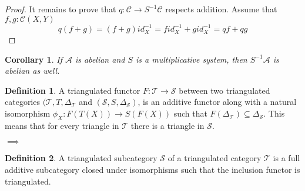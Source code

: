 \documentclass[11pt]{article}
\newtheorem{corollary}{Corollary}[theorem]
\theoremstyle{definition}
\newtheorem{definition}{Definition}[section]
\theoremstyle{remark}
\begin{document}
\begin{proof}
                It remains to prove that $q:\mathcal{C}\rightarrow S^{-1}\mathcal{C}$ respects addition. Assume that $f,g:\mathcal{C}(X,Y)$
                \begin{equation*}
                    q(f+g)=(f+g)id_X^{-1}=fid_X^{-1}+gid_X^{-1}=qf+qg
                \end{equation*} 
            \end{proof}

            \begin{corollary}
                If $\mathcal{A}$ is abelian and $S$ is a multiplicative system, then $S^{-1}\mathcal{A}$ is abelian as well.
            \end{corollary}

            \begin{definition}
                A triangulated functor $F: \mathcal{T} \rightarrow \mathcal{S}$ between two triangulated categories $(\mathcal{T}, T, \Delta_\mathcal{T}$ and $(\mathcal{S}, S, \Delta_\mathcal{S})$, is an additive functor along with a natural isomorphism $\phi_X : F(T(X)) \rightarrow S(F(X))$ such that $F(\Delta_{\mathcal{T}}) \subseteq \Delta_{\mathcal{S}}$. This means that for every triangle in $\mathcal{T}$ there is a triangle in $\mathcal{S}$.
                \begin{center}
                    $\implies$
                \end{center}
            \end{definition}

            \begin{definition}
                A triangulated subcategory $\mathcal{S}$ of a triangulated category $\mathcal{T}$ is a full additive subcategory closed under isomorphisms such that the inclusion functor is triangulated.
            \end{definition}
\end{document}
